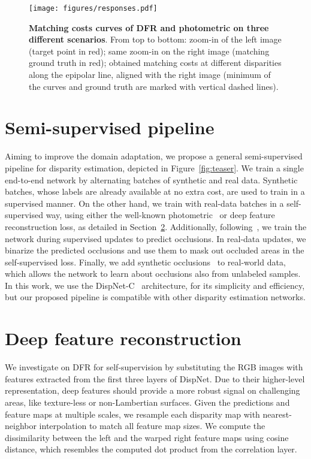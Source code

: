 \documentclass[final]{cvpr}
\begin{document}
\begin{figure*}
\begin{center}
\texttt{[image: figures/responses.pdf]}
\end{center}
   \caption{{\bf Matching costs curves of DFR and photometric on three different scenarios}. From top to bottom: zoom-in of the left image (target point in red); same zoom-in on the right image (matching ground truth in red); obtained matching costs at different disparities along the epipolar line, aligned with the right image (minimum of the curves and ground truth are marked with vertical dashed lines).}
\label{fig:responses}
\end{figure*}

\section{Semi-supervised pipeline}

Aiming to improve the domain adaptation, we propose a general semi-supervised pipeline for disparity estimation, depicted in Figure~\ref{fig:teaser}. We train a single end-to-end network by alternating batches of synthetic and real data. Synthetic batches, whose labels are already available at no extra cost, are used to train in a supervised manner. On the other hand, we train with real-data batches in a self-supervised way, using either the well-known photometric~\cite{godard2019digging} or deep feature reconstruction loss, as detailed in Section~\ref{section:dfr}. Additionally, following~\cite{ilg2018occ}, we train the network during supervised updates to predict occlusions. In real-data updates, we binarize the predicted occlusions and use them to mask out occluded areas in the self-supervised loss. Finally, we add synthetic occlusions~\cite{yang2019hierarchical, tankovich2020hitnet} to real-world data, which allows the network to learn about occlusions also from unlabeled samples.
In this work, we use the DispNet-C~\cite{mayer2016large} architecture, for its simplicity and efficiency, but our proposed pipeline is compatible with other disparity estimation networks.


\section{Deep feature reconstruction}\label{section:dfr}
We investigate on DFR for self-supervision by substituting the RGB images with features extracted from the first three layers of DispNet. Due to their higher-level representation, deep features should provide a more robust signal on challenging areas, like texture-less or non-Lambertian surfaces.
Given the predictions and feature maps at multiple scales, we resample each disparity map with nearest-neighbor interpolation to match all feature map sizes. We compute the dissimilarity between the left and the warped right feature maps using cosine distance, which resembles the computed dot product from the correlation layer.
\end{document}
